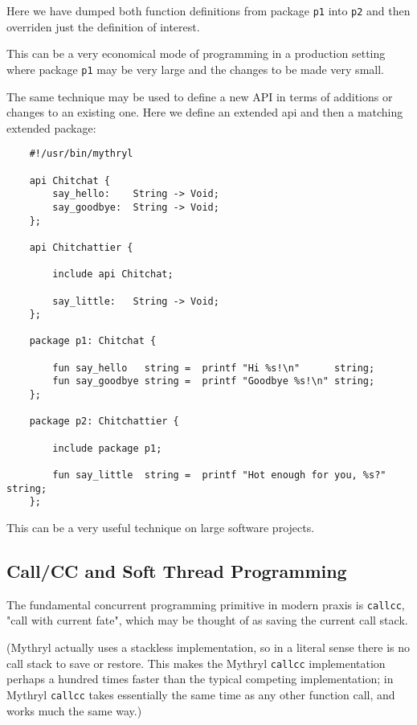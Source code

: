 Here we have dumped both function definitions from package {\tt p1} 
into {\tt p2} and then overriden just the definition of interest.

This can be a very economical mode of programming in a production setting 
where package {\tt p1} may be very large and the changes to be made very 
small.

The same technique may be used to define a new API in terms of additions 
or changes to an existing one.  Here we define an extended api and then 
a matching extended package:

\begin{verbatim}
    #!/usr/bin/mythryl

    api Chitchat {
        say_hello:    String -> Void;
        say_goodbye:  String -> Void;
    };

    api Chitchattier {

        include api Chitchat;

        say_little:   String -> Void;
    };

    package p1: Chitchat {

        fun say_hello   string =  printf "Hi %s!\n"      string;
        fun say_goodbye string =  printf "Goodbye %s!\n" string;
    };

    package p2: Chitchattier {

        include package p1;

        fun say_little  string =  printf "Hot enough for you, %s?"  string;
    };
\end{verbatim}

This can be a very useful technique on large software projects.

\cutend*

\subsection{Call/CC and Soft Thread Programming}
\label{section:tut:full-monte:callcc}

The fundamental concurrent programming primitive in modern praxis 
is {\tt callcc}, "call with current fate", which may be 
thought of as saving the current call stack.

(Mythryl actually uses a stackless implementation, so in a literal 
sense there is no call stack to save or restore.  This makes the 
Mythryl {\tt callcc} implementation perhaps a hundred times faster 
than the typical competing implementation; in Mythryl {\tt callcc} 
takes essentially the same time as any other function call, and 
works much the same way.)


